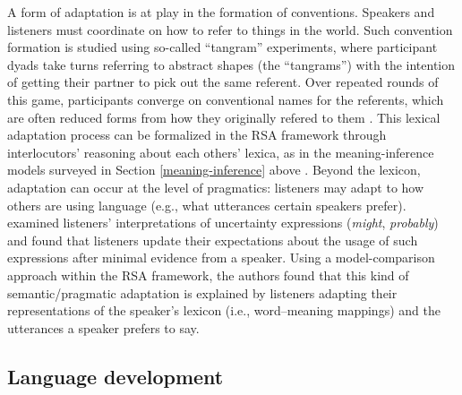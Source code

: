 \documentclass{sp}
\begin{document}
A form of adaptation is at play in the formation of conventions. 
Speakers and listeners must coordinate on how to refer to things in the world.
Such convention formation is studied using so-called ``tangram'' experiments, where participant dyads take turns referring to abstract shapes (the ``tangrams'') with the intention of getting their partner to pick out the same referent. 
Over repeated rounds of this game, participants converge on conventional names for the referents, which are often reduced forms from how they originally refered to them \citep{clark1986referring, hawkins2020characterizing}.
This  lexical adaptation process can be formalized in the RSA framework through interlocutors' reasoning about each others' lexica, as in the meaning-inference models surveyed in Section \ref{meaning-inference} above \citep{hawkins2017convention}.
Beyond the lexicon, adaptation can occur at the level of pragmatics: listeners may adapt to how others are using language (e.g., what utterances certain speakers prefer). 
\cite{schuster2020know} examined listeners' interpretations of uncertainty expressions (\emph{might}, \emph{probably}) and found that listeners update their expectations about the usage of such expressions after minimal evidence from a speaker. 
Using a model-comparison approach within the RSA framework, the authors found that this kind of semantic/pragmatic adaptation is explained by listeners adapting their representations of the speaker's lexicon (i.e., word--meaning mappings) and the utterances a speaker prefers to say. 

\subsection{Language development}
\end{document}
